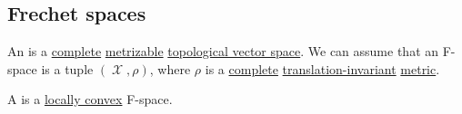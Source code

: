 \subsection{Frechet spaces}\label{subsec:frechet_spaces}

\begin{definition}\label{def:frechet_space}
  An  is a \hyperref[thm:uniform_space_completion]{complete} \hyperref[def:metric_topology]{metrizable} \hyperref[def:topological_vector_space]{topological vector space}. We can assume that an F-space is a tuple \( (\mscrX, \rho) \), where \( \rho \) is a \hyperref[def:complete_metric_space]{complete} \hyperref[def:translation_invariant_metric]{translation-invariant} \hyperref[def:metric_space]{metric}.

  A  is a \hyperref[def:locally_convex_space]{locally convex} F-space.
\end{definition}
